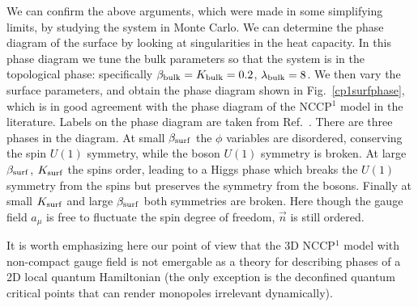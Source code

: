 \documentclass[prb,twocolumn]{revtex4-1}
\begin{document}
We can confirm the above arguments, which were made in some simplifying limits, by studying the system in Monte Carlo. We can determine the phase diagram of the surface by looking at singularities in the heat capacity. In this phase diagram we tune the bulk parameters so that the system is in the topological phase: specifically $\beta_{\rm bulk}=K_{\rm bulk}=0.2$, $\lambda_{\rm bulk}=8$. We then vary the surface parameters, and obtain the phase diagram shown in Fig.~\ref{cp1surfphase}, which is in good agreement with the phase diagram of the NCCP$^1$ model in the literature. Labels on the phase diagram are taken from Ref.~.
There are three phases in the diagram. At small $\beta_{\rm surf}$ the $\phi$ variables are disordered, conserving the spin $U(1)$ symmetry, while the boson $U(1)$ symmetry is broken. At large $\beta_{\rm surf}$, $K_{\rm surf}$ the spins order, leading to a Higgs phase which breaks the $U(1)$ symmetry from the spins but preserves the symmetry from the bosons. Finally at small $K_{\rm surf}$ and large $\beta_{\rm surf}$ both symmetries are broken. Here though the gauge field $a_\mu$ is free to fluctuate the spin degree of freedom, $\vec{n}$ is still ordered.

It is worth emphasizing here our point of view that the 3D NCCP$^1$ model with non-compact gauge field is not emergable as a theory for describing phases of a 2D local quantum Hamiltonian (the only exception is the deconfined quantum critical points that can render monopoles irrelevant dynamically). 
\end{document}
